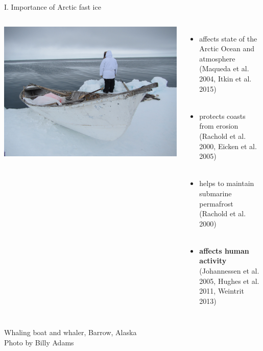 \documentclass[8pt]{beamer}
\begin{document}
\setwatermark{\fontsize{125pt}{125pt}\selectfont{}}
\begin{frame}[fragile]{I. Importance of Arctic fast ice}
	\begin{columns}
		\includegraphics[width=1\textwidth]{./img/Whaling-Boat-and-whaler-Barrow-1.jpg}\\
		\begin{itemize}
			\item affects state of the Arctic Ocean and atmosphere\\(Maqueda et al. 2004, Itkin et al. 2015)\\~\\ 
			\item protects coasts from erosion\\(Rachold et al. 2000, Eicken et al. 2005)\\~\\ 
			\item helps to maintain submarine permafrost\\ (Rachold et al. 2000)\\~\\
			\item \textbf{affects human activity}\\(Johannessen et al. 2005, Hughes et al. 2011, Weintrit 2013)
		\end{itemize}
	\end{columns}

	Whaling boat and whaler, Barrow, Alaska\\
	Photo by Billy Adams
\end{frame}
\end{document}
